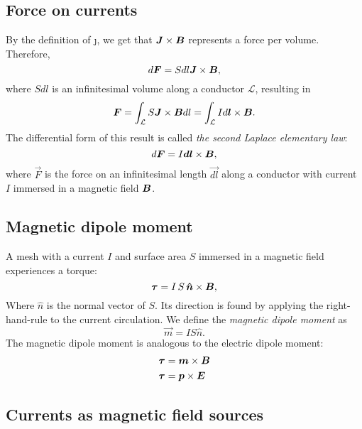 \subsection{Force on currents}
    By the definition of \j, we get that $\bm{J} \times \bm{B}$ represents a force per volume. Therefore, 
    \begin{equation}
        d\bm{F} = S dl \bm{J} \times \bm{B}, 
    \end{equation}
    where $S dl$ is an infinitesimal volume along a conductor $\mathcal{L}$, resulting in 
    \begin{equation}
        \bm{F} = \int_\mathcal{L} S \bm{J} \times \bm{B} dl = \int_\mathcal{L} I d\bm{l} \times \bm{B}.
    \end{equation}
    The differential form of this result is called \textit{the second Laplace elementary law}:
    \begin{equation}
        d\bm{F} = I\bm{dl} \times \bm{B},
    \end{equation}
    where $\vec{F}$ is the force on an infinitesimal length $\vec{dl}$ along a conductor with current $I$ 
    immersed in a magnetic field $\bm{B}$.
    
\subsection{Magnetic dipole moment}

    A mesh with a current $I$ and surface area $S$ immersed in a magnetic field experiences a torque:
    \begin{equation}
        \vec{\tau} = I\,S\,\hat{n}\times\B,
    \end{equation}
    Where $\hat{n}$ is the normal vector of $S$. Its direction is found by applying the right-hand-rule to the current circulation. 
    We define the \textit{magnetic dipole moment} as
    \begin{equation}
        \vec{m} = IS\hat{n}.
    \end{equation}
    The magnetic dipole moment is analogous to the electric dipole moment: 
    \begin{align*}
        \bm{\tau} &= \bm{m} \times \bm{B}\\
        \bm{\tau} &= \bm{p} \times \bm{E}
    \end{align*}

\subsection{Currents as magnetic field sources}

